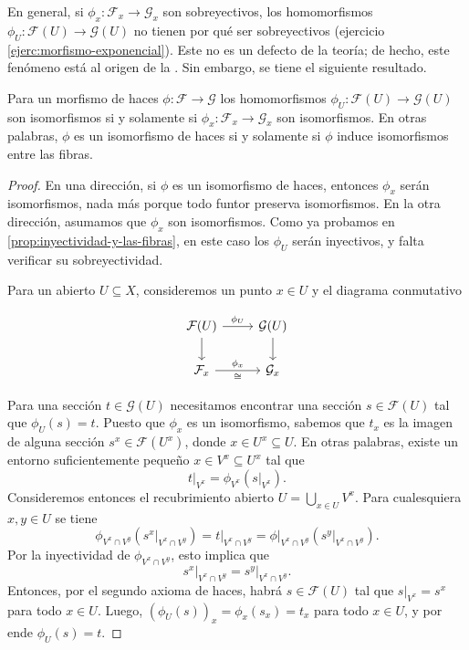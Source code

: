 \documentclass{article}
\numberwithin{equation}{section}
\theoremstyle{definition}
\begin{document}
En general, si $\phi_x\colon \mathcal{F}_x \to \mathcal{G}_x$ son sobreyectivos,
los homomorfismos $\phi_U\colon \mathcal{F} (U) \to \mathcal{G} (U)$ no tienen
por qué ser sobreyectivos (ejercicio \ref{ejerc:morfismo-exponencial}).
Este no es un defecto de la teoría; de hecho, este fenómeno está al origen
de la . Sin embargo, se tiene el siguiente resultado.

\begin{proposicion}
  \label{prop:iso-sobre-las-fibras}
  Para un morfismo de haces $\phi\colon \mathcal{F} \to \mathcal{G}$
  los homomorfismos $\phi_U\colon \mathcal{F} (U) \to \mathcal{G} (U)$ son
  isomorfismos si y solamente si $\phi_x\colon \mathcal{F}_x \to \mathcal{G}_x$
  son isomorfismos. En otras palabras, $\phi$ es un isomorfismo de haces si y
  solamente si $\phi$ induce isomorfismos entre las fibras.

  \begin{proof}
    En una dirección, si $\phi$ es un isomorfismo de haces, entonces $\phi_x$
    serán isomorfismos, nada más porque todo funtor preserva isomorfismos.
    En la otra dirección, asumamos que $\phi_x$ son isomorfismos. Como ya
    probamos en \ref{prop:inyectividad-y-las-fibras}, en este caso los $\phi_U$
    serán inyectivos, y falta verificar su sobreyectividad.

    Para un abierto $U \subseteq X$, consideremos un punto $x \in U$ y
    el diagrama conmutativo

    \[ \begin{tikzcd}
        \mathcal{F} (U) \ar{r}{\phi_U}\ar{d} & \mathcal{G} (U)\ar{d} \\
        \mathcal{F}_x \ar{r}{\phi_x}[swap]{\isom} & \mathcal{G}_x
      \end{tikzcd} \]

    Para una sección $t \in \mathcal{G} (U)$ necesitamos encontrar una sección
    $s \in \mathcal{F} (U)$ tal que $\phi_U (s) = t$. Puesto que $\phi_x$
    es un isomorfismo, sabemos que $t_x$ es la imagen de alguna sección
    $s^x \in \mathcal{F} (U^x)$, donde $x \in U^x \subseteq U$. En otras
    palabras, existe un entorno suficientemente pequeño
    $x \in V^x \subseteq U^x$ tal que
    $$\left.t\right|_{V^x} = \phi_{V^x} (\left.s\right|_{V^x}).$$
    Consideremos entonces el recubrimiento abierto
    $U = \bigcup_{x\in U} V^x$. Para cualesquiera $x,y \in U$ se tiene
    \[ \phi_{V^x \cap V^y} (\left.s^x\right|_{V^x \cap V^y}) =
       \left.t\right|_{V^x\cap V^y} =
       \left.\phi\right|_{V^x\cap V^y} (\left.s^y\right|_{V^x \cap V^y}). \]
    Por la inyectividad de $\phi_{V^x \cap V^y}$, esto implica que
    $$\left.s^x\right|_{V^x \cap V^y} = \left.s^y\right|_{V^x \cap V^y}.$$
    Entonces, por el segundo axioma de haces, habrá $s \in \mathcal{F} (U)$ tal
    que $\left.s\right|_{V^x} = s^x$ para todo $x \in U$. Luego,
    $(\phi_U (s))_x = \phi_x (s_x) = t_x$ para todo $x\in U$, y por ende
    $\phi_U (s) = t$.
  \end{proof}
\end{proposicion}
\end{document}
